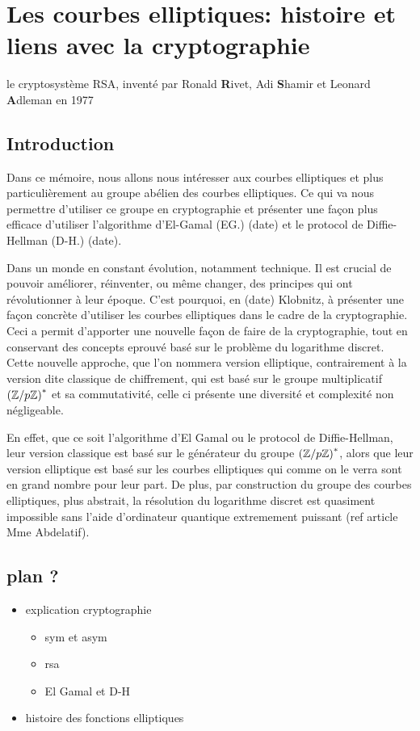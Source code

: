 \chapter{Les courbes elliptiques: histoire et liens avec la cryptographie}
le cryptosystème RSA, inventé par Ronald \textbf{R}ivet, Adi
\textbf{S}hamir et Leonard \textbf{A}dleman en 1977
\section{Introduction}

Dans ce mémoire, nous allons nous intéresser aux courbes elliptiques et plus particulièrement
au groupe abélien des courbes elliptiques. Ce qui va nous permettre d'utiliser ce groupe en
cryptographie et présenter une façon plus efficace d'utiliser l'algorithme d'El-Gamal (EG.) (date) et le
protocol de Diffie-Hellman (D-H.) (date).

Dans un monde en constant évolution, notamment technique. Il est crucial de pouvoir
améliorer, réinventer, ou même changer, des principes qui ont révolutionner à leur époque.
C'est pourquoi, en (date) Klobnitz, à présenter une façon concrète d'utiliser les courbes
elliptiques dans le cadre de la cryptographie. Ceci a permit d'apporter une nouvelle façon
de faire de la cryptographie, tout en conservant des concepts eprouvé basé sur le problème
du logarithme discret. Cette nouvelle approche, que l'on nommera
version elliptique, contrairement à la version dite classique de chiffrement, qui est basé
sur le groupe multiplicatif $\left( \mathbb{Z} /p\mathbb{Z} \right) ^{*}$ et sa commutativité, celle ci
présente une diversité et complexité non négligeable. 

En effet, que ce soit l'algorithme d'El Gamal ou le protocol de Diffie-Hellman, leur version
classique est basé sur le générateur du groupe $\left( \mathbb{Z} / p\mathbb{Z} \right) ^{*}$, alors que
leur version elliptique est basé sur les courbes elliptiques qui comme on le verra sont en grand
nombre pour leur part. De plus, par construction du groupe des courbes elliptiques, plus
abstrait, la résolution du logarithme discret est quasiment impossible sans l'aide d'ordinateur
quantique extremement puissant (ref article Mme Abdelatif).

\section{plan ?}

\begin{itemize}
    \item explication cryptographie
        \begin{itemize}
            \item sym et asym
            \item rsa
            \item El Gamal et D-H
        \end{itemize}
    \item histoire des fonctions elliptiques 
\end{itemize}

